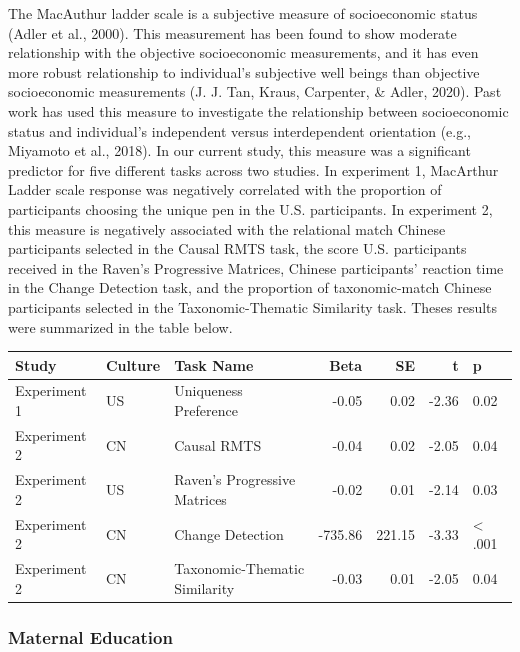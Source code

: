 \documentclass[
  man,floatsintext]{apa6}
\begin{document}
The MacAuthur ladder scale is a subjective measure of socioeconomic status (Adler et al., 2000). This measurement has been found to show moderate relationship with the objective socioeconomic measurements, and it has even more robust relationship to individual's subjective well beings than objective socioeconomic measurements (J. J. Tan, Kraus, Carpenter, \& Adler, 2020). Past work has used this measure to investigate the relationship between socioeconomic status and individual's independent versus interdependent orientation (e.g., Miyamoto et al., 2018). In our current study, this measure was a significant predictor for five different tasks across two studies. In experiment 1, MacArthur Ladder scale response was negatively correlated with the proportion of participants choosing the unique pen in the U.S. participants. In experiment 2, this measure is negatively associated with the relational match Chinese participants selected in the Causal RMTS task, the score U.S. participants received in the Raven's Progressive Matrices, Chinese participants' reaction time in the Change Detection task, and the proportion of taxonomic-match Chinese participants selected in the Taxonomic-Thematic Similarity task. Theses results were summarized in the table below.

\begin{table}
\centering\begingroup\fontsize{9.5}{11.5}\selectfont

\begin{tabular}{l|l|l|r|r|r|l}
\hline
Study & Culture & Task Name & Beta & SE & t & p\\
\hline
Experiment 1 & US & Uniqueness Preference & -0.05 & 0.02 & -2.36 & 0.02\\
Experiment 2 & CN & Causal RMTS & -0.04 & 0.02 & -2.05 & 0.04\\
Experiment 2 & US & Raven's Progressive Matrices & -0.02 & 0.01 & -2.14 & 0.03\\
Experiment 2 & CN & Change Detection & -735.86 & 221.15 & -3.33 & < .001\\
Experiment 2 & CN & Taxonomic-Thematic Similarity & -0.03 & 0.01 & -2.05 & 0.04\\
\hline
\end{tabular}
\endgroup{}
\end{table}

\hypertarget{maternal-education}{%
\subsubsection{Maternal Education}\label{maternal-education}}
\end{document}
